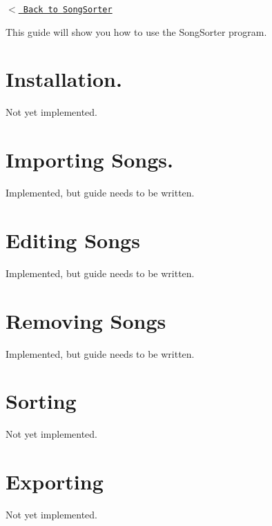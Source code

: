 \href{index.html}{\tt $<$ Back to Song\+Sorter}

This guide will show you how to use the Song\+Sorter program.\hypertarget{usage_guide_installationUsageGuide}{}\section{Installation.}\label{usage_guide_installationUsageGuide}
Not yet implemented.\hypertarget{usage_guide_importingUsageGuide}{}\section{Importing Songs.}\label{usage_guide_importingUsageGuide}
Implemented, but guide needs to be written.\hypertarget{usage_guide_editingUsageGuide}{}\section{Editing Songs}\label{usage_guide_editingUsageGuide}
Implemented, but guide needs to be written.\hypertarget{usage_guide_removingUsageGuide}{}\section{Removing Songs}\label{usage_guide_removingUsageGuide}
Implemented, but guide needs to be written.\hypertarget{usage_guide_Sorting}{}\section{Sorting}\label{usage_guide_Sorting}
Not yet implemented.\hypertarget{usage_guide_Exporting}{}\section{Exporting}\label{usage_guide_Exporting}
Not yet implemented. 